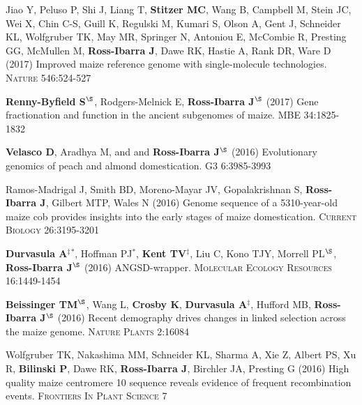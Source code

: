 \documentclass[letterpaper,10pt]{article}
\begin{document}
\begin{etaremune}
\item  Jiao Y, Peluso P,  Shi J,  Liang T, {\bf Stitzer MC}, Wang B,  Campbell M, Stein JC,  Wei X,  Chin C-S,  Guill K,  Regulski M,  Kumari S,  Olson A,  Gent J, Schneider KL,  Wolfgruber TK, May MR, Springer N,  Antoniou E,  McCombie R, Presting GG,  McMullen M, {\bf Ross-Ibarra J}, Dawe RK,  Hastie A, Rank DR, Ware D (2017) Improved maize reference genome with single-molecule technologies. \textsc{Nature}  546:524-527

\item  {\bf Renny-Byfield S}$^\S$, Rodgers-Melnick E, {\bf Ross-Ibarra J}$^\S$ (2017) Gene fractionation and function in the ancient subgenomes of maize. \textsc{MBE} 34:1825-1832

\item {\bf Velasco D}, Aradhya M, and  and {\bf Ross-Ibarra J}$^\S$ (2016) Evolutionary genomics of peach and almond domestication. \textsc{G3} 6:3985-3993

\item Ramos-Madrigal J, Smith BD, Moreno-Mayar JV, Gopalakrishnan S, {\bf Ross-Ibarra J}, Gilbert MTP, Wales N (2016) Genome sequence of a 5310-year-old maize cob provides insights into the early stages of maize domestication. \textsc{Current Biology} 26:3195-3201

\item {\bf Durvasula A}$^\ddagger$$^*$,  Hoffman PJ$^*$, {\bf Kent TV}$^\ddagger$, Liu C, Kono TJY, Morrell PL$^\S$, {\bf Ross-Ibarra J}$^\S$ (2016) ANGSD-wrapper. \textsc{Molecular Ecology Resources} 16:1449-1454

\item {\bf Beissinger TM}$^\S$, Wang L, {\bf Crosby K}, {\bf Durvasula A}$^\ddagger$, Hufford MB, {\bf Ross-Ibarra J}$^\S$ (2016)  Recent demography drives changes in linked selection across the maize genome. \textsc{Nature Plants} 2:16084

\item Wolfgruber TK, Nakashima MM, Schneider KL, Sharma A, Xie Z, Albert PS, Xu R, {\bf Bilinski P},  Dawe RK, {\bf Ross-Ibarra J}, Birchler JA, Presting G (2016) High quality maize centromere 10 sequence reveals evidence of frequent recombination events. \textsc{Frontiers In Plant Science} 7


\end{etaremune}
\end{document}
